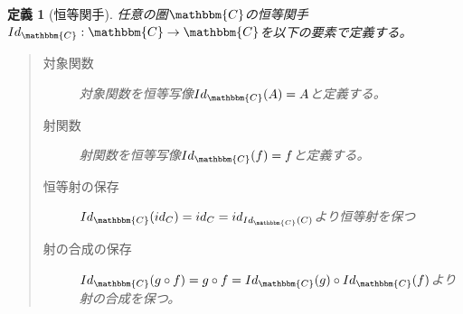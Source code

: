 \documentclass[dvipdfmx]{jsarticle}
\newcommand{\cat}[1]{\mathbbm{#1}}
\newcommand{\arrow}{\rightarrow}
\newcommand{\functor}[3]{#1:\cat{#2}\arrow \cat{#3}}
\newtheorem{define}{定義}[section]
\numberwithin{proof}{subsection}
\numberwithin{prop}{subsection}
\numberwithin{define}{subsection}
\begin{document}
	\begin{define}[恒等関手]
		任意の圏$\cat{C}$の恒等関手$\functor{Id_{\cat{C}}}{C}{C}$を以下の要素で定義する。
		\begin{quote}
			\begin{description}
				\item[対象関数] 対象関数を恒等写像$Id_{\cat{C}}(A)=A$と定義する。
				\item[射関数] 射関数を恒等写像$Id_{\cat{C}}(f)=f$と定義する。
				\item[恒等射の保存] $Id_{\cat{C}}(id_C)=id_C=id_{Id_{\cat{C}}(C)}$より恒等射を保つ
				\item[射の合成の保存] $Id_{\cat{C}}(g\circ f)=g\circ f=Id_{\cat{C}}(g)\circ Id_{\cat{C}}(f)$より射の合成を保つ。
			\end{description}
		\end{quote}
	\end{define}
\end{document}
